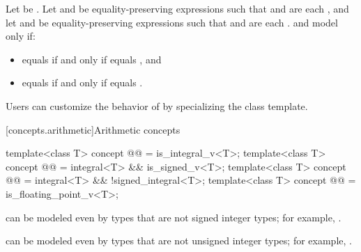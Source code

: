 \begin{itemdescr}
\pnum
Let  be .
Let  and  be
equality-preserving expressions such that
 and  are each , and
let  and  be equality-preserving expressions such that
 and  are each .
 and  model 
only if:
\begin{itemize}
\item {} equals  if and only if
   equals , and
\item {} equals  if and only if
   equals .
\end{itemize}

\pnum
\begin{note}
Users can customize the behavior of  by specializing the
 class template.
\end{note}

\end{itemdescr}

[concepts.arithmetic]{Arithmetic concepts}

\begin{itemdecl}
template<class T>
  concept @@ = is_integral_v<T>;
template<class T>
  concept @@ = integral<T> && is_signed_v<T>;
template<class T>
  concept @@ = integral<T> && !signed_integral<T>;
template<class T>
  concept @@ = is_floating_point_v<T>;
\end{itemdecl}

\begin{itemdescr}
\pnum
\begin{note}
 can be modeled even by types that are
not signed integer types; for example, .
\end{note}

\pnum
\begin{note}
 can be modeled even by types that are
not unsigned integer types; for example, .
\end{note}
\end{itemdescr}

